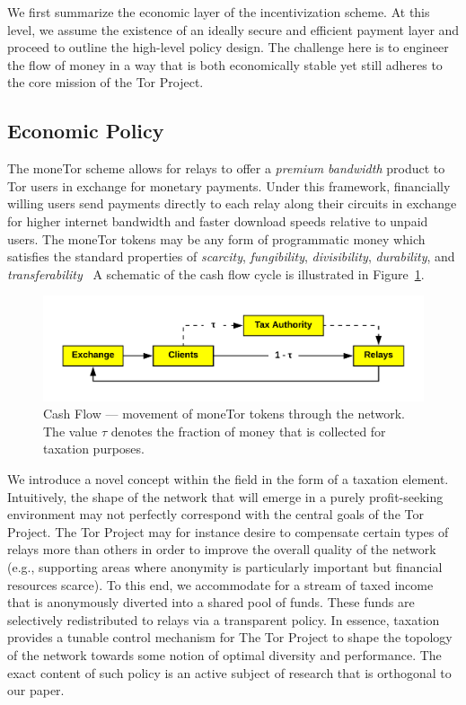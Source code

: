 
We first summarize the economic layer of the incentivization scheme. At this
level, we assume the existence of an ideally secure and efficient payment layer
and proceed to outline the high-level policy design. The challenge here is to
engineer the flow of money in a way that is both economically stable yet still
adheres to the core mission of the Tor Project.

\subsection{Economic Policy}
The moneTor scheme allows for relays to offer a \emph{premium bandwidth} product
to Tor users in exchange for monetary payments. Under this framework,
financially willing users send payments directly to each relay along their circuits
in exchange for higher internet bandwidth and faster download speeds relative to
unpaid users. %
The moneTor tokens %
may be any form of programmatic money which satisfies the standard properties of
\textit{scarcity}, \textit{fungibility}, \textit{divisibility},
\textit{durability}, and
\textit{transferability}~\cite[p.3]{crump2011phenomenon} A schematic of the cash
flow cycle is illustrated in Figure~\ref{fig:economic}.

\begin{figure}[h] \centering
  \includegraphics[trim={0.5cm, 0.5cm, 0.5cm, 0.5cm}, clip, scale=0.7]{images/economic_diagram.png}
  \caption[Cash Flow]{Cash Flow --- movement of moneTor tokens through the
    network. The value $\tau$ denotes the fraction of money that is collected
    for taxation purposes.}
  \label{fig:economic}
\end{figure}


We introduce a novel concept within the field in the form of a
taxation element. Intuitively, the shape of the network that will
emerge in a purely profit-seeking environment may not perfectly
correspond with the central goals of the Tor Project. The Tor Project
may for instance desire to compensate certain types of relays more
than others in order to improve the overall quality of the network
(e.g., supporting areas where anonymity is particularly important but
financial resources scarce). To this end, we accommodate for a stream
of taxed income that is anonymously diverted into a shared pool of
funds. These funds are selectively redistributed to relays via a
transparent policy.  In essence, taxation provides a tunable control
mechanism for The Tor Project to shape the topology of the network
towards some notion of optimal diversity and performance. The exact
content of such policy is an active subject of research that is
orthogonal to our paper. 

